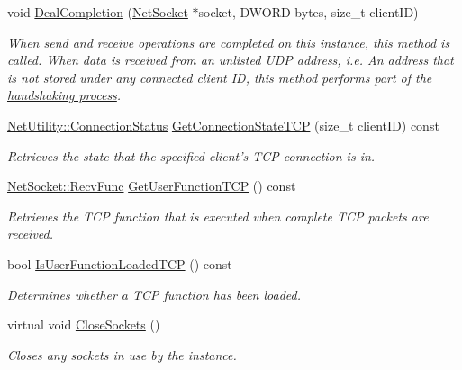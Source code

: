 \begin{DoxyCompactItemize}
void \hyperlink{class_net_instance_server_ae7ce00865c6b1224deb6ea7c29efff4f}{DealCompletion} (\hyperlink{class_net_socket}{NetSocket} $\ast$socket, DWORD bytes, size\_\-t clientID)
\begin{DoxyCompactList}\small\item\em When send and receive operations are completed on this instance, this method is called. When data is received from an unlisted UDP address, i.e. An address that is not stored under any connected client ID, this method performs part of the \hyperlink{handshake_page}{handshaking process}. \item\end{DoxyCompactList}\item 
\hyperlink{class_net_utility_a7eae52138f8bd597ffc67ebf07e86b6d}{NetUtility::ConnectionStatus} \hyperlink{class_net_instance_server_a130905df8ecd72b55f44cf0c650abfd7}{GetConnectionStateTCP} (size\_\-t clientID) const 
\begin{DoxyCompactList}\small\item\em Retrieves the state that the specified client's TCP connection is in. \item\end{DoxyCompactList}\item 
\hyperlink{class_net_socket_a52b5f4de8d0a47fd8620f542b21c076c}{NetSocket::RecvFunc} \hyperlink{class_net_instance_server_afc0c9da88cbcee8d440ee56327c95073}{GetUserFunctionTCP} () const 
\begin{DoxyCompactList}\small\item\em Retrieves the TCP function that is executed when complete TCP packets are received. \item\end{DoxyCompactList}\item 
bool \hyperlink{class_net_instance_server_a737e649eb26f28c1273a5ef1b6d783fa}{IsUserFunctionLoadedTCP} () const 
\begin{DoxyCompactList}\small\item\em Determines whether a TCP function has been loaded. \item\end{DoxyCompactList}\item 
virtual void \hyperlink{class_net_instance_server_aa0f96225d448f4b35a8a09dcbd0232ab}{CloseSockets} ()
\begin{DoxyCompactList}\small\item\em Closes any sockets in use by the instance. \item\end{DoxyCompactList}\end{DoxyCompactItemize}
